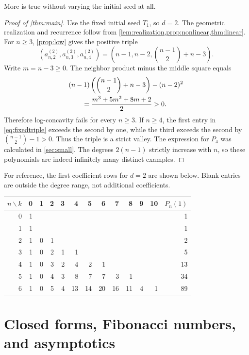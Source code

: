 \documentclass[11pt,letterpaper]{article}
\numberwithin{equation}{section}
\theoremstyle{definition}
\begin{document}
More is true without varying the initial seed at all.

\begin{proof}[Proof of \cref{thm:main}]
Use the fixed initial seed $T_1$, so $d=2$. The geometric realization and
recurrence follow from \cref{lem:realization,prop:nonlinear,thm:linear}.
For $n\geq3$, \cref{prop:low} gives the positive triple
\begin{equation}\label{eq:fixedtriple}
 \left(a_{n,2}^{(2)},a_{n,3}^{(2)},a_{n,4}^{(2)}\right)
 =\left(n-1,n-2,\binom{n-1}{2}+n-3\right).
\end{equation}
Write $m=n-3\geq0$. The neighbor product minus the middle square equals
\begin{align}\label{eq:defect}
 &(n-1)\left(\binom{n-1}{2}+n-3\right)-(n-2)^2\\
 &\hspace{2em}=\frac{m^3+5m^2+8m+2}{2}>0.\notag
\end{align}
Therefore log-concavity fails for every $n\geq3$. If $n\geq4$, the first
entry in \eqref{eq:fixedtriple} exceeds the second by one, while the third
exceeds the second by $\binom{n-1}{2}-1>0$. Thus the triple is a strict
valley. The expression for $P_4$ was calculated in \cref{sec:small}.
The degrees $2(n-1)$ strictly increase with $n$, so these polynomials are
indeed infinitely many distinct examples.
\end{proof}

For reference, the first coefficient rows for $d=2$ are shown below. Blank
entries are outside the degree range, not additional coefficients.
\begin{center}
\small
\setlength{\tabcolsep}{4.7pt}
\begin{tabular}{r|rrrrrrrrrrr|r}
\toprule
$n\backslash k$&0&1&2&3&4&5&6&7&8&9&10&$P_n(1)$\\
\midrule
0&1&&&&&&&&&&&1\\
1&1&&&&&&&&&&&1\\
2&1&0&1&&&&&&&&&2\\
3&1&0&2&1&1&&&&&&&5\\
4&1&0&3&2&4&2&1&&&&&13\\
5&1&0&4&3&8&7&7&3&1&&&34\\
6&1&0&5&4&13&14&20&16&11&4&1&89\\
\bottomrule
\end{tabular}
\end{center}

\section{Closed forms, Fibonacci numbers, and asymptotics}\label{sec:asymptotics}
\end{document}
